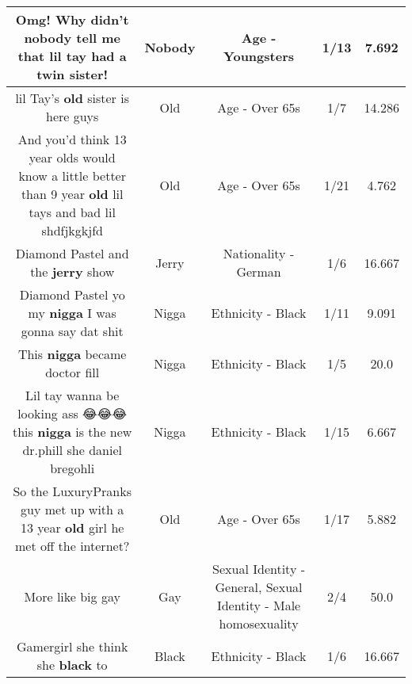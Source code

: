 \documentclass[11pt]{article}
\newlength\mylength
\begin{document}
\begin{center}
\begin{longtable}{|C{.65\mylength}|C{.30\mylength}|C{.12\mylength}|C{.12\mylength}|C{.12\mylength}|}
  \small Omg! Why didn't \textbf{nobody} tell me that lil tay had a twin sister!\normalsize   & Nobody & Age - Youngsters & 1/13 & 7.692 \\  \hline
  \small lil Tay's \textbf{old} sister is here guys\normalsize   & Old & Age - Over 65s & 1/7 & 14.286 \\  \hline
  \small And you'd think 13 year olds would know a little better than 9 year \textbf{old} lil tays and bad lil shdfjkgkjfd\normalsize   & Old & Age - Over 65s & 1/21 & 4.762 \\  \hline
  \small Diamond Pastel and the \textbf{jerry} show\normalsize   & Jerry & Nationality - German & 1/6 & 16.667 \\  \hline
  \small Diamond Pastel yo my \textbf{nigga} I was gonna say dat shit\normalsize   & Nigga & Ethnicity - Black & 1/11 & 9.091 \\  \hline
  \small This \textbf{nigga} became doctor fill\normalsize   & Nigga & Ethnicity - Black & 1/5 & 20.0 \\  \hline
  \small Lil tay wanna be looking ass 😂😂😂this \textbf{nigga} is the new dr.phill she daniel bregohli\normalsize   & Nigga & Ethnicity - Black & 1/15 & 6.667 \\  \hline
  \small So the LuxuryPranks guy met up with a 13 year \textbf{old} girl he met off the internet?\normalsize   & Old & Age - Over 65s & 1/17 & 5.882 \\  \hline
  \small More like big gay\normalsize   & Gay & Sexual Identity - General, Sexual Identity - Male homosexuality & 2/4 & 50.0 \\  \hline
  \small Gamergirl she think she \textbf{black} to\normalsize   & Black & Ethnicity - Black & 1/6 & 16.667 \\  \hline

\end{longtable}
\end{center}
\end{document}
